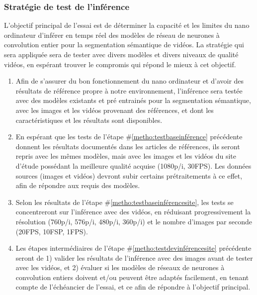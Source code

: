 \subsubsection{Stratégie de test de l'inférence}
\par L'objectif principal de l'essai est de déterminer la capacité et les limites du nano ordinateur d'inférer en temps réel des modèles de réseau de neurones à convolution entier pour la segmentation sémantique de vidéos. La stratégie qui sera appliquée sera de tester avec divers modèles et divers niveaux de qualité vidéos, en espérant trouver le compromis qui répond le mieux à cet objectif.
\begin{enumerate}
   \item \label{metho:testbaseinférence} Afin de s'assurer du bon fonctionnement du nano ordinateur et d'avoir des résultats de référence propre à notre environnement, l'inférence sera testée avec des modèles existants et pré entrainés pour la segmentation sémantique, avec les images et les vidéos provenant des références, et dont les caractéristiques et les résultats sont disponibles. 
   \item \label{metho:testbaseinférencesite} En espérant que les tests de l'étape \#\ref{metho:testbaseinférence} précédente donnent les résultats documentés dans les articles de références, ils seront repris avec les mêmes modèles, mais avec les images et les vidéos du site d'étude possédant la meilleure qualité acquise (1080p/i, 30FPS). Les données sources (images et vidéos) devront subir certains prétraitements à ce effet, afin de répondre aux requis des modèles.
   \item \label{metho:testdevinférencesite} Selon les résultats de l'étape \#\ref{metho:testbaseinférencesite}, les tests se concentreront sur l'inférence avec des vidéos, en réduisant progressivement la résolution (760p/i, 576p/i, 480p/i, 360p/i) et le nombre d'images par seconde (20FPS, 10FSP, 1FPS).
   \item Les étapes intermédiaires de l'étape \#\ref{metho:testdevinférencesite} précédente seront de 1) valider les résultats de l'inférence avec des images avant de tester avec les vidéos, et 2) évaluer si les modèles de réseaux de neurones à convolution entiers doivent et/ou peuvent être adaptés facilement, en tenant compte de l'échéancier de l'essai, et ce afin de répondre à l'objectif principal.
\end{enumerate}
